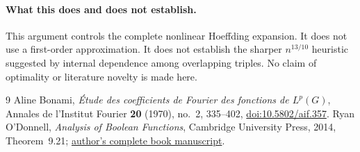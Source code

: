 \documentclass[11pt]{article}
\begin{document}
\paragraph{What this does and does not establish.}
This argument controls the complete nonlinear Hoeffding expansion. It does
not use a first-order approximation. It does not establish the sharper
$n^{13/10}$ heuristic suggested by internal dependence among overlapping
triples. No claim of optimality or literature novelty is made here.
\begin{thebibliography}{9}
 Aline Bonami, \emph{\'Etude des coefficients de Fourier des fonctions de $L^p(G)$}, Annales de l'Institut Fourier \textbf{20} (1970), no.~2, 335--402, \href{https://aif.centre-mersenne.org/item/AIF_1970__20_2_335_0/}{doi:10.5802/aif.357}.
 Ryan O'Donnell, \emph{Analysis of Boolean Functions}, Cambridge University Press, 2014, Theorem~9.21; \href{https://www.cs.cmu.edu/~odonnell/papers/Analysis-of-Boolean-Functions-by-Ryan-ODonnell.pdf}{author's complete book manuscript}.
\end{thebibliography}
\end{document}
